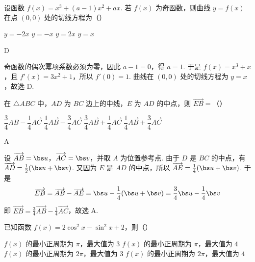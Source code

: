 \begin{problem}
设函数 \(f(x)=x^3+(a-1)x^2+ax\). 若 \(f(x)\) 为奇函数，则曲线 \(y=f(x)\) 在点 \((0,0)\) 处的切线方程为（\quad）

\choices
    {\(y=-2x\)}
    {\(y=-x\)}
    {\(y=2x\)}
    {\(y=x\)}
\end{problem}

\begin{answer}
D
\end{answer}

\begin{solution}
奇函数的偶次幂项系数必须为零，因此 \(a-1=0\)，得 \(a=1\). 于是 \(f(x)=x^3+x\)，且 \(f'(x)=3x^2+1\)，所以 \(f'(0)=1\). 曲线在 \((0,0)\) 处的切线方程为 \(y=x\)，故选 D.
\end{solution}

\begin{problem}
在 \(\triangle ABC\) 中，\(AD\) 为 \(BC\) 边上的中线，\(E\) 为 \(AD\) 的中点，则 \(\overrightarrow{EB}=\)（\quad）

\choices
    {\(\dfrac34\overrightarrow{AB}-\dfrac14\overrightarrow{AC}\)}
    {\(\dfrac14\overrightarrow{AB}-\dfrac34\overrightarrow{AC}\)}
    {\(\dfrac34\overrightarrow{AB}+\dfrac14\overrightarrow{AC}\)}
    {\(\dfrac14\overrightarrow{AB}+\dfrac34\overrightarrow{AC}\)}
\end{problem}

\begin{answer}
A
\end{answer}

\begin{solution}
设 \(\overrightarrow{AB}=\bs u\)，\(\overrightarrow{AC}=\bs v\)，并取 \(A\) 为位置参考点. 由于 \(D\) 是 \(BC\) 的中点，有 \(\overrightarrow{AD}=\frac12(\bs u+\bs v)\). 又因为 \(E\) 是 \(AD\) 的中点，所以 \(\overrightarrow{AE}=\frac14(\bs u+\bs v)\).
于是
\[
\overrightarrow{EB}=\overrightarrow{AB}-\overrightarrow{AE}=\bs u-\frac14(\bs u+\bs v)=\frac34\bs u-\frac14\bs v
\]
即 \(\overrightarrow{EB}=\frac34\overrightarrow{AB}-\frac14\overrightarrow{AC}\)，故选 A.
\end{solution}

\begin{problem}
已知函数 \(f(x)=2\cos^2 x-\sin^2 x+2\)，则（\quad）

\choices
    {\(f(x)\) 的最小正周期为 \(\pi\)，最大值为 \(3\)}
    {\(f(x)\) 的最小正周期为 \(\pi\)，最大值为 \(4\)}
    {\(f(x)\) 的最小正周期为 \(2\pi\)，最大值为 \(3\)}
    {\(f(x)\) 的最小正周期为 \(2\pi\)，最大值为 \(4\)}
\end{problem}

